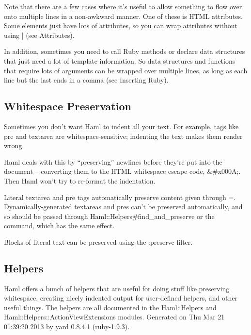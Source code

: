 \documentclass[10pt]{article}
\begin{document}
 Note that there are a few cases where it’s useful to allow something to flow over onto multiple lines in a non-awkward manner. One of these is HTML attributes. Some elements just have lots of attributes, so you can wrap attributes without using | (see Attributes).


 In addition, sometimes you need to call Ruby methods or declare data structures that just need a lot of template information. So data structures and functions that require lots of arguments can be wrapped over multiple lines, as long as each line but the last ends in a comma (see Inserting Ruby).
\subsection*{Whitespace Preservation}


 Sometimes you don’t want Haml to indent all your text. For example, tags like pre and textarea are whitespace-sensitive; indenting the text makes them render wrong.


 Haml deals with this by “preserving” newlines before they’re put into the document – converting them to the HTML whitespace escape code, \&\#x000A;. Then Haml won’t try to re-format the indentation.


 Literal textarea and pre tags automatically preserve content given through =. Dynamically-generated textareas and pres can’t be preserved automatically, and so should be passed through Haml::Helpers\#find\_and\_preserve or the ~ command, which has the same effect.


 Blocks of literal text can be preserved using the :preserve filter.
\subsection*{Helpers}


 Haml offers a bunch of helpers that are useful for doing stuff like preserving whitespace, creating nicely indented output for user-defined helpers, and other useful things. The helpers are all documented in the Haml::Helpers and Haml::Helpers::ActionViewExtensions modules.
 Generated on Thu Mar 21 01:39:20 2013 by yard 0.8.4.1 (ruby-1.9.3). 
\end{document}
